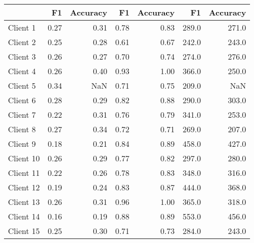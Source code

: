 \begin{tabular}{lrrrrrr}
\toprule
{} &    F1 &  Accuracy &    F1 &  Accuracy &     F1 &  Accuracy \\
\midrule
Client 1  &  0.27 &      0.31 &  0.78 &      0.83 &  289.0 &     271.0 \\
Client 2  &  0.25 &      0.28 &  0.61 &      0.67 &  242.0 &     243.0 \\
Client 3  &  0.26 &      0.27 &  0.70 &      0.74 &  274.0 &     276.0 \\
Client 4  &  0.26 &      0.40 &  0.93 &      1.00 &  366.0 &     250.0 \\
Client 5  &  0.34 &       NaN &  0.71 &      0.75 &  209.0 &       NaN \\
Client 6  &  0.28 &      0.29 &  0.82 &      0.88 &  290.0 &     303.0 \\
Client 7  &  0.22 &      0.31 &  0.76 &      0.79 &  341.0 &     253.0 \\
Client 8  &  0.27 &      0.34 &  0.72 &      0.71 &  269.0 &     207.0 \\
Client 9  &  0.18 &      0.21 &  0.84 &      0.89 &  458.0 &     427.0 \\
Client 10 &  0.26 &      0.29 &  0.77 &      0.82 &  297.0 &     280.0 \\
Client 11 &  0.22 &      0.26 &  0.78 &      0.83 &  348.0 &     316.0 \\
Client 12 &  0.19 &      0.24 &  0.83 &      0.87 &  444.0 &     368.0 \\
Client 13 &  0.26 &      0.31 &  0.96 &      1.00 &  365.0 &     318.0 \\
Client 14 &  0.16 &      0.19 &  0.88 &      0.89 &  553.0 &     456.0 \\
Client 15 &  0.25 &      0.30 &  0.71 &      0.73 &  284.0 &     243.0 \\
\bottomrule
\end{tabular}
